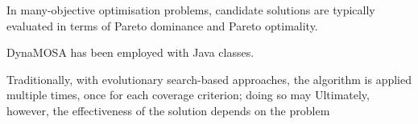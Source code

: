 In many-objective optimisation problems, candidate solutions are typically evaluated in terms of Pareto dominance and Pareto optimality.


DynaMOSA has been employed with Java classes.

Traditionally, with evolutionary search-based approaches, the algorithm is applied multiple times, 
once for each coverage criterion; doing so may 
Ultimately, however, the effectiveness of the solution depends on the problem